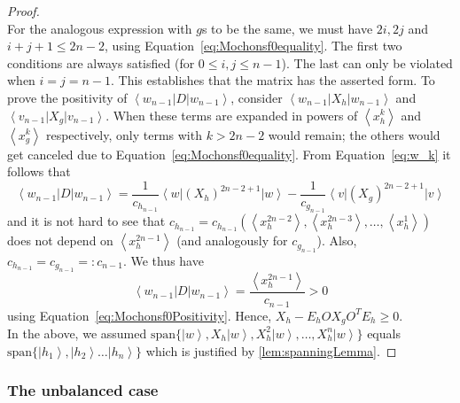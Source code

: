\documentclass{article}
\begin{document}
\begin{proof}
\begin{equation}
  \end{equation}
  For the analogous expression with $g$s to be the same, we must have
  $2i,2j$ and $i+j+1\leq2n-2$, using Equation~\eqref{eq:Mochonsf0equality}. The first two conditions
  are always satisfied (for $0\le i,j\le n-1$). The last can only be
  violated when $i=j=n-1$. This establishes that the matrix has the
  asserted form.	To prove the positivity of $\left\langle w_{n-1}\right|D\left|w_{n-1}\right\rangle $,
  consider $\left\langle w_{n-1}\right|X_{h}\left|w_{n-1}\right\rangle $
  and $\left\langle v_{n-1}\right|X_{g}\left|v_{n-1}\right\rangle $.
  When these terms are expanded in powers of $\left\langle x_{h}^{k}\right\rangle $
  and $\left\langle x_{g}^{k}\right\rangle $ respectively, only terms
  with $k>2n-2$ would remain; the others would get canceled due to
  Equation~\eqref{eq:Mochonsf0equality}. From Equation~\eqref{eq:w_k} it follows that
  \begin{displaymath}
    \left\langle w_{n-1}\right|D\left|w_{n-1}\right\rangle =\frac{1}{c_{h_{n-1}}}\left\langle w\right|(X_{h})^{2n-2+1}\left|w\right\rangle -\frac{1}{c_{g_{n-1}}}\left\langle v\right|(X_{g})^{2n-2+1}\left|v\right\rangle
  \end{displaymath}
  and it is not hard to see that $c_{h_{n-1}}=c_{h_{n-1}}(\left\langle x_{h}^{2n-2}\right\rangle ,\left\langle x_{h}^{2n-3}\right\rangle ,\dots,\left\langle x_{h}^{1}\right\rangle )$
  does not depend on $\left\langle x_{h}^{2n-1}\right\rangle $ (and analogously for $c_{g_{n-1}}$). Also, $c_{h_{n-1}}=c_{g_{n-1}}=:c_{n-1}$.
  We thus have
  \begin{displaymath}
    \left\langle w_{n-1}\right|D\left|w_{n-1}\right\rangle =\frac{\left\langle x_{h}^{2n-1}\right\rangle }{c_{n-1}}>0
  \end{displaymath}
  using Equation~\eqref{eq:Mochonsf0Positivity}. Hence, $X_{h}-E_{h}OX_{g}O^{T}E_{h}\ge0$.\\
  In the above, we assumed $\text{span}\{\left|w\right\rangle ,X_{h}\left|w\right\rangle ,X_{h}^{2}\left|w\right\rangle ,\dots,X_{h}^{n}\left|w\right\rangle \}$
  equals $\text{span}\{\left|h_{1}\right\rangle ,\left|h_{2}\right\rangle \dots\left|h_{n}\right\rangle \}$
  which is justified by \cref{lem:spanningLemma}.
\end{proof}




\subsubsection{The unbalanced case}
\label{subsubsec:unbalancedf0algebraic}
\end{document}
